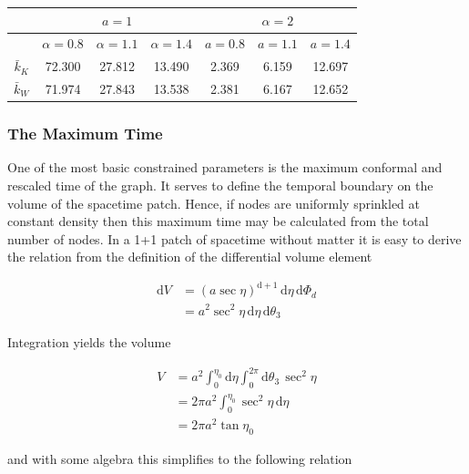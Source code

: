 \documentclass[preprint,notitlepage,amsmath,amssymb,floatfix]{revtex4-1}
\begin{document}
\begin{center}
\begin{tabular}{|c||c|c|c||c|c|c|}
  \hline
  & \multicolumn{3}{|c||}{$a = 1$} & \multicolumn{3}{|c|}{$\alpha = 2$} \\ \hline
  & $\alpha = 0.8$ & $\alpha = 1.1$ & $\alpha = 1.4$ & $a = 0.8$ & $a = 1.1$ & $a = 1.4$ \\ \hline
  $\bar{k}_K$ & 72.300 & 27.812 & 13.490 & 2.369 & 6.159 & 12.697 \\ \hline
  $\bar{k}_W$ & 71.974 & 27.843 & 13.538 & 2.381 & 6.167 & 12.652 \\
  \hline
\end{tabular}
\end{center}

\subsubsection{The Maximum Time}
One of the most basic constrained parameters is the maximum conformal and rescaled time of the graph.
It serves to define the temporal boundary on the volume of the spacetime patch.  
Hence, if nodes are uniformly sprinkled at constant density then this maximum time may be calculated from the total number of nodes.
In a 1+1 patch of spacetime without matter it is easy to derive the relation from the definition of the differential volume element

\begin{equation}
\begin{split}
\mathrm{d}V &= \left(a\sec\eta\right)^{\mathrm{d}+1}\,\mathrm{d}\eta\,\mathrm{d}\Phi_d \\
   &= a^2\sec^2\eta\,\mathrm{d}\eta\,\mathrm{d}\theta_3
\end{split}
\end{equation}

\noindent Integration yields the volume

\begin{equation}
\begin{split}
V &= a^2\int_0^{\eta_0}\!\mathrm{d}\eta\int_0^{2\pi}\!\mathrm{d}\theta_3\,\sec^2\eta \\
  &= 2\pi a^2\int_0^{\eta_0}\!\sec^2\eta\,\mathrm{d}\eta \\
  &= 2\pi a^2\tan\eta_0
\end{split}
\end{equation}

\noindent and with some algebra this simplifies to the following relation
\end{document}
